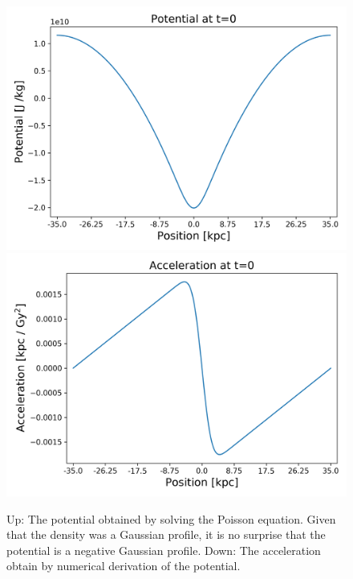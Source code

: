 \begin{figure}[h!]
    \centering
    \includegraphics[scale=0.6]{imag/1dInitPot.png}
    \includegraphics[scale=0.6]{imag/1dInitAcce.png}
    \caption{Up: The potential obtained by solving the Poisson equation. Given that the density was a Gaussian profile, it is no surprise that the potential is a negative Gaussian profile. Down: The acceleration obtain by numerical derivation of the potential.}
    \label{1dInit2}
\end{figure}

